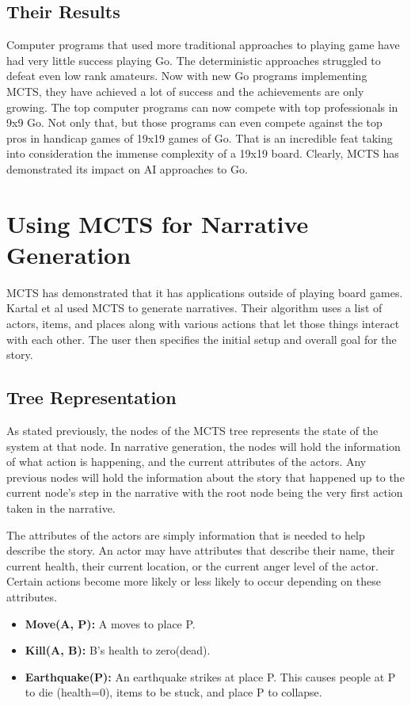 \documentclass{sig-alternate}
\begin{document}
\subsection{Their Results}
Computer programs that used more traditional approaches to playing game have had very little success playing Go. The deterministic approaches struggled to defeat even low rank amateurs. Now with new Go programs implementing MCTS, they have achieved a lot of success and the achievements are only growing. The top computer programs can now compete with top professionals in 9x9 Go\cite{RAVEinGo}. Not only that, but those programs can even compete against the top pros in handicap games of 19x19 games of Go. That is an incredible feat taking into consideration the immense complexity of a 19x19 board. Clearly, MCTS has demonstrated its impact on AI approaches to Go.

\section{Using MCTS for Narrative Generation}
MCTS has demonstrated that it has applications outside of playing board games. Kartal et al\cite{Narrative} used MCTS to generate narratives. Their algorithm uses a list of actors, items, and places along with various actions that let those things interact with each other. The user then specifies the initial setup and overall goal for the story.

\subsection{Tree Representation}
As stated previously, the nodes of the MCTS tree represents the state of the system at that node. In narrative generation, the nodes will hold the information of what action is happening, and the current attributes of the actors. Any previous nodes will hold the information about the story that happened up to the current node's step in the narrative with the root node being the very first action taken in the narrative.

The attributes of the actors are simply information that is needed to help describe the story. An actor may have attributes that describe their name, their current health, their current location, or the  current anger level of the actor. Certain actions become more likely or less likely to occur depending on these attributes.

\begin{itemize}
\item \textbf{Move(A, P):} A moves to place P.
\item \textbf{Kill(A, B):} B's health to zero(dead).
\item \textbf{Earthquake(P):} An earthquake strikes at place P. This causes people at P to die (health=0), items to be stuck, and place P to collapse.
\end{itemize}
\end{document}
